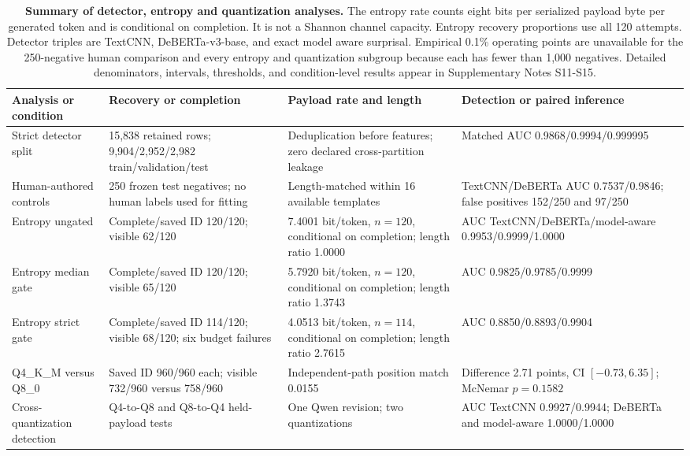 \documentclass[fleqn,10pt]{wlscirep}
\begin{document}
\begin{table}[H]
\centering
\footnotesize
\setlength{\tabcolsep}{3pt}
\begin{tabularx}{\textwidth}{L{0.17\textwidth}L{0.25\textwidth}L{0.24\textwidth}Y}
\toprule
Analysis or condition & Recovery or completion & Payload rate and length & Detection or paired inference \\
\midrule
Strict detector split & 15,838 retained rows; 9,904/2,952/2,982 train/validation/test & Deduplication before features; zero declared cross-partition leakage & Matched AUC 0.9868/0.9994/0.999995 \\
Human-authored controls & 250 frozen test negatives; no human labels used for fitting & Length-matched within 16 available templates & TextCNN/DeBERTa AUC 0.7537/0.9846; false positives 152/250 and 97/250 \\
Entropy ungated & Complete/saved ID 120/120; visible 62/120 & 7.4001 bit/token, \(n=120\), conditional on completion; length ratio 1.0000 & AUC TextCNN/DeBERTa/model-aware 0.9953/0.9999/1.0000 \\
Entropy median gate & Complete/saved ID 120/120; visible 65/120 & 5.7920 bit/token, \(n=120\), conditional on completion; length ratio 1.3743 & AUC 0.9825/0.9785/0.9999 \\
Entropy strict gate & Complete/saved ID 114/120; visible 68/120; six budget failures & 4.0513 bit/token, \(n=114\), conditional on completion; length ratio 2.7615 & AUC 0.8850/0.8893/0.9904 \\
Q4\_K\_M versus Q8\_0 & Saved ID 960/960 each; visible 732/960 versus 758/960 & Independent-path position match 0.0155 & Difference 2.71 points, CI \([-0.73,6.35]\); McNemar \(p=0.1582\) \\
Cross-quantization detection & Q4-to-Q8 and Q8-to-Q4 held-payload tests & One Qwen revision; two quantizations & AUC TextCNN 0.9927/0.9944; DeBERTa and model-aware 1.0000/1.0000 \\
\bottomrule
\end{tabularx}
\caption{\label{tab:v3-summary}\textbf{Summary of detector, entropy and quantization analyses.} The entropy rate counts eight bits per serialized payload byte per generated token and is conditional on completion. It is not a Shannon channel capacity. Entropy recovery proportions use all 120 attempts. Detector triples are TextCNN, DeBERTa-v3-base, and exact model aware surprisal. Empirical 0.1\% operating points are unavailable for the 250-negative human comparison and every entropy and quantization subgroup because each has fewer than 1,000 negatives. Detailed denominators, intervals, thresholds, and condition-level results appear in Supplementary Notes S11-S15.}
\end{table}
\end{document}
